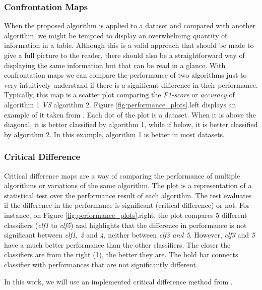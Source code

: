 \subsubsection{Confrontation Maps}

When the proposed algorithm is applied to a dataset and compared with another algorithm, we might be tempted to display an overwhelming quantity of information in a table. Although this is a valid approach that should be made to give a full picture to the reader, there should also be a straightforward way of displaying the same information but that can be read in a glance. With confrontation maps we can compare the performance of two algorithms just to very intuitively understand if there is a significant difference in their performance. Typically, this map is a scatter plot comparing the \textit{F1-score} or \textit{accuracy} of algorithm 1 \textit{VS} algorithm 2. Figure \ref{fig:performance_plots}.left displays an example of it taken from \cite{keogh_presentation}. Each dot of the plot is a dataset. When it is above the diagonal, it is better classified by algorithm 1, while if below, it is better classified by algorithm 2. In this example, algorithm 1 is better in most datasets.

\subsubsection{Critical Difference}

Critical difference maps are a way of comparing the performance of multiple algorithms or variations of the same algorithm. The plot is a representation of a statistical test over the performance result of each algorithm. The test evaluates if the difference in the performance is significant (critical difference) or not. For instance, on Figure \ref{fig:performance_plots}.right, the plot compares 5 different classifiers (\textit{clf1} to \textit{clf5}) and highlights that the difference in performance is not significant between \textit{clf1, 2} and \textit{4}, neither between \textit{clf3 and 5}. However, \textit{clf3} and \textit{5} have a much better performance than the other classifiers. The closer the classifiers are from the right (1), the better they are. The bold bar connects classifier with performances that are not significantly different.
\par
In this work, we will use an implemented critical difference method from \cite{critical_dif}.
